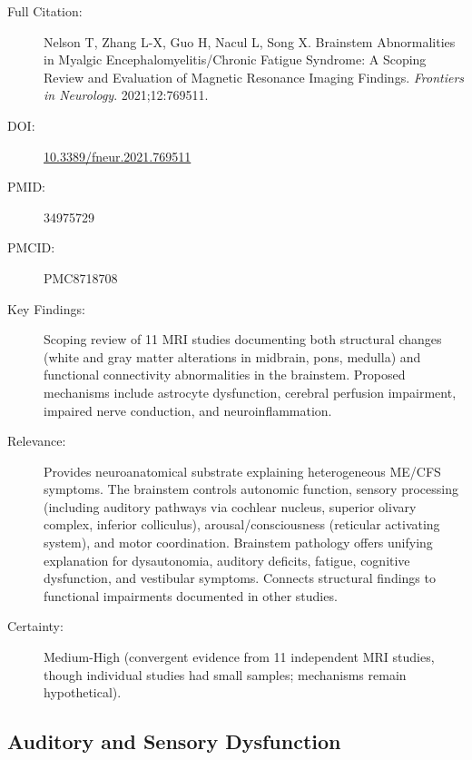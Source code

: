 \begin{description}
    \item[Full Citation:] Nelson T, Zhang L-X, Guo H, Nacul L, Song X. Brainstem Abnormalities in Myalgic Encephalomyelitis/Chronic Fatigue Syndrome: A Scoping Review and Evaluation of Magnetic Resonance Imaging Findings. \textit{Frontiers in Neurology}. 2021;12:769511.
    \item[DOI:] \href{https://doi.org/10.3389/fneur.2021.769511}{10.3389/fneur.2021.769511}
    \item[PMID:] 34975729
    \item[PMCID:] PMC8718708
    \item[Key Findings:] Scoping review of 11 MRI studies documenting both structural changes (white and gray matter alterations in midbrain, pons, medulla) and functional connectivity abnormalities in the brainstem. Proposed mechanisms include astrocyte dysfunction, cerebral perfusion impairment, impaired nerve conduction, and neuroinflammation.
    \item[Relevance:] Provides neuroanatomical substrate explaining heterogeneous ME/CFS symptoms. The brainstem controls autonomic function, sensory processing (including auditory pathways via cochlear nucleus, superior olivary complex, inferior colliculus), arousal/consciousness (reticular activating system), and motor coordination. Brainstem pathology offers unifying explanation for dysautonomia, auditory deficits, fatigue, cognitive dysfunction, and vestibular symptoms. Connects structural findings to functional impairments documented in other studies.
    \item[Certainty:] Medium-High (convergent evidence from 11 independent MRI studies, though individual studies had small samples; mechanisms remain hypothetical).
\end{description}

\subsection{Auditory and Sensory Dysfunction}

